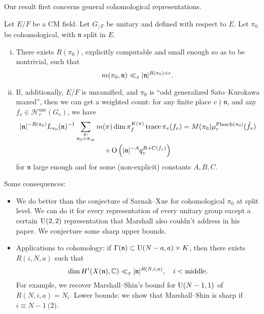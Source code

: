 \documentclass[reqno]{amsart} 
\begin{document}
Our result first concerns general cohomological representations.
\begin{theorem}[Dalal--GG]
  Let $E/F$ be a CM field.  Let $G_{/F}$ be unitary and defined with respect to $E$.  Let $\pi_0$ be cohomological, with $\mathfrak{n}$ split in $E$.
  \begin{enumerate}[(i)]
  \item There exists $R (\pi_0)$, explicitly computable and small enough so as to be nontrivial, such that
    \begin{equation*}
      m (\pi_0, \mathfrak{n} ) \ll_\varepsilon \lvert \mathfrak{n}  \rvert^{R (\pi_0 ) + \varepsilon }.
    \end{equation*} 
  \item If, additionally, $E/F$ is unramified, and $\pi_0 $ is ``odd generalized Sato--Kurokawa maxed'', then we can get a weighted count: for any finite place $v \nmid \mathfrak{n}$, and any $f_v \in \mathcal{H}_v^{\mathrm{unr}} (G_v)$, we have
    \begin{multline*}
      \lvert \mathfrak{n}  \rvert^{- R (\pi_0 )} L_{\pi_0 } (\mathfrak{n} )^{-1}
      \sum_{
        \substack{
          \pi :  \\
           \pi_0 = \pi _\infty 
        }
      }
      m (\pi) \dim \pi_f^{K (\pi) }
      \operatorname{trace} \pi_v (f_v )
      = M (\pi_0 )
      \mu_r^{\operatorname{Planch}(\pi_0 )} (\tilde{f}_v ) \\
      + \operatorname{O} \left( \lvert \mathfrak{n}  \rvert^{- A} q_v^{B + C (f_v )} \right)
    \end{multline*}
    for $\mathfrak{n}$ large enough and for some (non-explicit) constants $A,B,C$.
    
  \end{enumerate}
\end{theorem}
Some consequences:
\begin{itemize}
\item We do better than the conjecture of Sarnak--Xue for cohomological $\pi_0$ at split level.  We can do it for every representation of every unitary group except a certain $\operatorname{U}(2,2)$ representation that Marshall also couldn't address in his paper. We conjecture some sharp upper bounds.
\item Applications to cohomology: if $\Gamma (\mathfrak{n} ) \subset \operatorname{U} (N - a, a ) \times K$, then there exists $R (i, N, a)$ such that
  \begin{equation*}
\dim H^i (X (\mathfrak{n} ), \mathbb{C} ) \ll_\varepsilon \lvert \mathfrak{n}  \rvert^{R (N, i, a)}, \quad i < \mathrm{middle}.
  \end{equation*}
  For example, we recover Marshall--Shin's bound for $\operatorname{U} (N - 1, 1)$ of $R (N, i, a) = N_i$.  Lower bounds: we show that Marshall--Shin is sharp if $i \equiv N-1 \pod{2}$.
\end{itemize}
\end{document}
